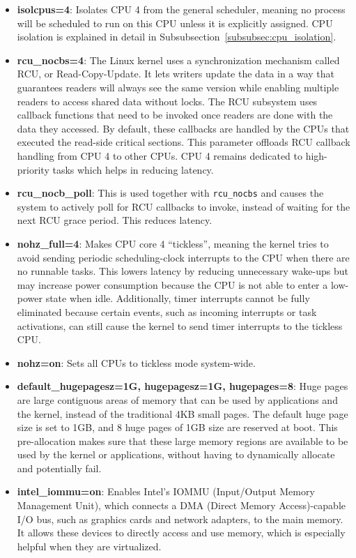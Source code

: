 \documentclass[MMR,Master,english]{twbook}
\begin{document}
\begin{itemize}
	\item \textbf{isolcpus=4}: Isolates CPU 4 from the general scheduler, meaning no process will be scheduled to run on this CPU unless it is explicitly assigned. CPU isolation is explained in detail in Subsubsection~\ref{subsubsec:cpu_isolation}.
	\item \textbf{rcu\_nocbs=4}: The Linux kernel uses a synchronization mechanism called RCU, or Read-Copy-Update. It lets writers update the data in a way that guarantees readers will always see the same version while enabling multiple readers to access shared data without locks. The RCU subsystem uses callback functions that need to be invoked once readers are done with the data they accessed. By default, these callbacks are handled by the CPUs that executed the read-side critical sections. This parameter offloads RCU callback handling from CPU 4 to other CPUs. CPU 4 remains dedicated to high-priority tasks which helps in reducing latency.
	\item \textbf{rcu\_nocb\_poll}: This is used together with \texttt{rcu\_nocbs} and causes the system to actively poll for RCU callbacks to invoke, instead of waiting for the next RCU grace period. This reduces latency.
	\item \textbf{nohz\_full=4}: Makes CPU core 4 ``tickless'', meaning the kernel tries to avoid sending periodic scheduling-clock interrupts to the CPU when there are no runnable tasks. This lowers latency by reducing unnecessary wake-ups but may increase power consumption because the CPU is not able to enter a low-power state when idle. Additionally, timer interrupts cannot be fully eliminated because certain events, such as incoming interrupts or task activations, can still cause the kernel to send timer interrupts to the tickless CPU.
	\item \textbf{nohz=on}: Sets all CPUs to tickless mode system-wide.
	\item \textbf{default\_hugepagesz=1G, hugepagesz=1G, hugepages=8}: Huge pages are large contiguous areas of memory that can be used by applications and the kernel, instead of the traditional 4KB small pages. The default huge page size is set to 1GB, and 8 huge pages of 1GB size are reserved at boot. This pre-allocation makes sure that these large memory regions are available to be used by the kernel or applications, without having to dynamically allocate and potentially fail.
	\item \textbf{intel\_iommu=on}: Enables Intel's IOMMU (Input/Output Memory Management Unit), which connects a DMA (Direct Memory Access)-capable I/O bus, such as graphics cards and network adapters, to the main memory. It allows these devices to directly access and use memory, which is especially helpful when they are virtualized.

\end{itemize}
\end{document}
